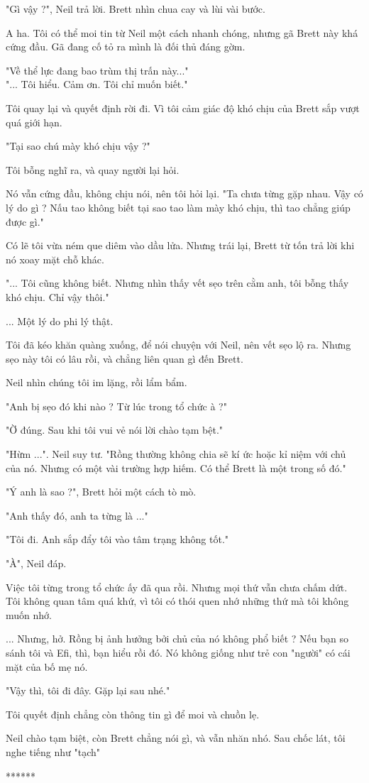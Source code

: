 "Gì vậy ?", Neil trả lời. Brett nhìn chua cay và lùi vài bước.

A ha. Tôi có thể moi tin từ Neil một cách nhanh chóng, nhưng gã Brett này khá cứng đầu. Gã đang cố tỏ ra mình là đối thủ đáng gờm.

"Về thể lực đang bao trùm thị trấn này..." \\


"... Tôi hiểu. Cảm ơn. Tôi chỉ muốn biết."

Tôi quay lại và quyết định rời đi. Vì tôi cảm giác độ khó chịu của Brett sắp vượt quá giới hạn.

"Tại sao chú mày khó chịu vậy ?"

Tôi bỗng nghĩ ra, và quay người lại hỏi.

Nó vẫn cứng đầu, không chịu nói, nên tôi hỏi lại. "Ta chưa từng gặp nhau. Vậy có lý do gì ? Nấu tao không biết tại sao tao làm mày khó chịu, thì tao chẳng giúp được gì."

Có lẽ tôi vừa ném que diêm vào dầu lửa. Nhưng trái lại, Brett từ tốn trả lời khi nó xoay mặt chỗ khác.

"... Tôi cũng không biết. Nhưng nhìn thấy vết sẹo trên cằm anh, tôi bỗng thấy khó chịu. Chỉ vậy thôi."

... Một lý do phi lý thật.

Tôi đã kéo khăn quàng xuống, để nói chuyện với Neil, nên vết sẹo lộ ra. Nhưng sẹo này tôi có lâu rồi, và chẳng liên quan gì đến Brett.

Neil nhìn chúng tôi im lặng, rồi lẩm bẩm.

"Anh bị sẹo đó khi nào ? Từ lúc trong tổ chức à ?"

"Ờ đúng. Sau khi tôi vui vẻ nói lời chào tạm bệt."

"Hừm ...". Neil suy tư. "Rồng thường không chia sẽ kí ức hoặc kỉ niệm với chủ của nó. Nhưng có một vài trường hợp hiếm. Có thể Brett là một trong số đó."

"Ý anh là sao ?", Brett hỏi một cách tò mò.

"Anh thấy đó, anh ta từng là ..."

"Tôi đi. Anh sắp đẩy tôi vào tâm trạng không tốt."

"À", Neil đáp.

Việc tôi từng trong tổ chức ấy đã qua rồi. Nhưng mọi thứ vẫn chưa chấm dứt. Tôi không quan tâm quá khứ, vì tôi có thói quen nhớ những thứ mà tôi không muốn nhớ.

... Nhưng, hở. Rồng bị ảnh hưởng bởi chủ của nó không phổ biết ? Nếu bạn so sánh tôi và Efi, thì, bạn hiểu rồi đó. Nó không giống như trẻ con "người" có cái mặt của bố mẹ nó.

"Vậy thì, tôi đi đây. Gặp lại sau nhé."

Tôi quyết định chẳng còn thông tin gì để moi và chuồn lẹ.

Neil chào tạm biệt, còn Brett chẳng nói gì, và vẫn nhăn nhó. Sau chốc lát, tôi nghe tiếng như "tạch" \\

\begin{center}
	******
\end{center}


